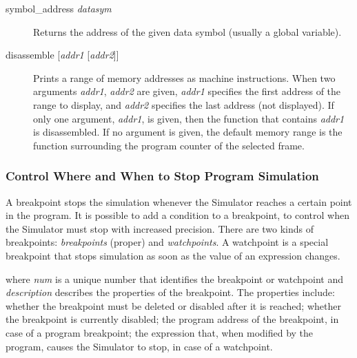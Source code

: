 \documentclass[a4paper,twoside]{tceusermanual}
\begin{document}
\begin{description}
\item[symbol\_address \emph{datasym} ] %

  Returns the address of the given data symbol (usually
  a global variable). 

\item[disassemble {[\emph{addr1} [\emph{addr2}]]}] %
  Prints a range of memory addresses as machine instructions.  When two
  arguments \emph{addr1}, \emph{addr2} are given, \emph{addr1} specifies the
  first address of the range to display, and \emph{addr2} specifies the last
  address (not displayed).  If only one argument, \emph{addr1}, is given,
  then the function that contains \emph{addr1} is disassembled.  If no
  argument is given, the default memory range is the function surrounding
  the program counter of the selected frame.

\end{description}

\subsubsection{Control Where and When to Stop Program Simulation}
\label{ssec:debug-breakpoints}

A breakpoint stops the simulation whenever the Simulator reaches a certain
point in the program. It is possible to add a condition to a breakpoint, to
control when the Simulator must stop with increased precision. There are two
kinds of breakpoints: \emph{breakpoints} (proper) and \emph{watchpoints}. A
watchpoint is a special breakpoint that stops simulation as soon as the
value of an expression changes.

%
where \emph{num} is a unique number that identifies the breakpoint or
watchpoint and \emph{description} describes the properties of the
breakpoint. The properties include: whether the breakpoint must be deleted
or disabled after it is reached; whether the breakpoint is currently
disabled; the program address of the breakpoint, in case of a program
breakpoint; the expression that, when modified by the program, causes the
Simulator to stop, in case of a watchpoint.
\end{document}
